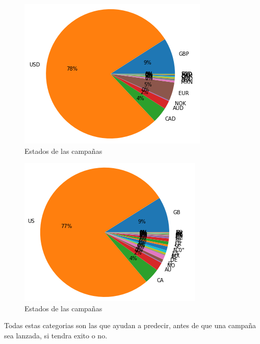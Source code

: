 \documentclass[journal]{IEEEtran}
\begin{document}
\begin{figure}[H]
    \centering
    \captionsetup{justification=centering}
\includegraphics[width=\linewidth]{Images/Currency.png}
    \caption{Estados de las campañas}
\end{figure}


\begin{figure}[H]
    \centering
    \captionsetup{justification=centering}
\includegraphics[width=\linewidth]{Images/Country.png}
    \caption{Estados de las campañas}
\end{figure}

Todas estas categorias son las que ayudan a predecir, antes de que una campaña sea lanzada, si tendra exito o no.
\end{document}
